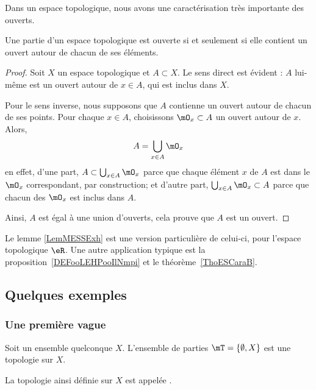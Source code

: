 Dans un espace topologique, nous avons une caractérisation très importante des ouverts.
\begin{theorem}		\label{ThoPartieOUvpartouv}
	Une partie d'un espace topologique est ouverte si et seulement si elle contient un ouvert autour de chacun de ses éléments.
\end{theorem}

\begin{proof}
	Soit \( X\) un espace topologique et \( A\subset X\). Le sens direct est évident : $A$ lui-même est un ouvert autour de $x\in A$, qui est inclus dans $X$.

	Pour le sens inverse, nous supposons que \( A\) contienne un ouvert autour de chacun de ses points. Pour chaque $x\in A$, choisissons $\mO_x\subset A$ un ouvert autour de $x$. Alors,
	\begin{equation}	\label{EqAUniondesOx}
		A=\bigcup_{x\in A}\mO_x
	\end{equation}
	en effet, d'une part, $A\subset\bigcup_{x\in A}\mO_x$ parce que chaque élément $x$ de $A$ est dans le $\mO_x$ correspondant, par construction; et d'autre part, $\bigcup_{x\in A}\mO_x\subset A$ parce que chacun des $\mO_x$ est inclus dans $A$.

	Ainsi, $A$ est égal à une union d'ouverts, cela prouve que $A$ est un ouvert.
\end{proof}
Le lemme \ref{LemMESSExh} est une version particulière de celui-ci, pour l'espace topologique \( \eR \). Une autre application typique est la proposition~\ref{DEFooLEHPooIlNmpi} et le théorème~\ref{ThoESCaraB}.

\subsection{Quelques exemples}

\subsubsection{Une première vague}

\begin{example}\label{DefTopologieGrossiere}
	Soit un ensemble quelconque \( X\). L'ensemble de parties \( \mT=\{ \emptyset, X \}\) est une topologie sur \( X\).

	La topologie ainsi définie sur \(X \) est appelée .
\end{example}

